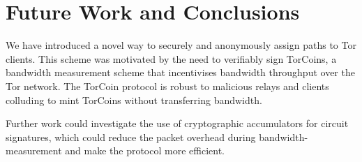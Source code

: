 \section{Future Work and Conclusions} \label{conc}

We have introduced a novel way to securely and anonymously assign paths to Tor
clients. This scheme was motivated by the need to verifiably sign TorCoins, a
bandwidth measurement scheme that incentivises bandwidth throughput over the Tor
network. The TorCoin protocol is robust to malicious relays and clients
colluding to mint TorCoins without transferring bandwidth.

Further work could investigate the use of cryptographic accumulators for circuit
signatures, which could reduce the packet overhead during bandwidth-measurement
and make the protocol more efficient.
